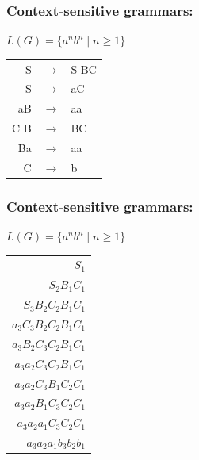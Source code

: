 \documentclass[compress,color=usenames]{beamer}
\begin{document}
\begin{frame}
\frametitle{Context-sensitive grammars:}

$L(G) = \{a^nb^n \mid n \geq 1\}$

\begin{center}
\begin{tabular}{rcl}
S & $\rightarrow$ & S BC \\

S & $\rightarrow$ & aC \\

aB & $\rightarrow$ & aa \\

C B & $\rightarrow$ & BC \\

Ba & $\rightarrow$ & aa \\

C & $\rightarrow$ & b
\end{tabular}
\end{center}

\end{frame}

\begin{frame}
\frametitle{Context-sensitive grammars:}

$L(G) = \{a^nb^n \mid n \geq 1\}$

\begin{center}
\begin{tabular}{r}
$S_1$\\
$S_2 B_1 C_1$\\
$S_3 B_2 C_2 B_1 C_1$\\
$a_3 C_3 B_2 C_2 B_1 C_1$\\
$a_3 B_2 C_3 C_2 B_1 C_1$\\
$a_3 a_2 C_3 C_2 B_1 C_1$\\
$a_3 a_2 C_3 B_1 C_2 C_1$\\
$a_3 a_2 B_1 C_3 C_2 C_1$\\
$a_3 a_2 a_1 C_3 C_2 C_1$\\
$a_3 a_2 a_1 b_3 b_2 b_1$\\
\end{tabular}
\end{center}

\end{frame}
\end{document}
